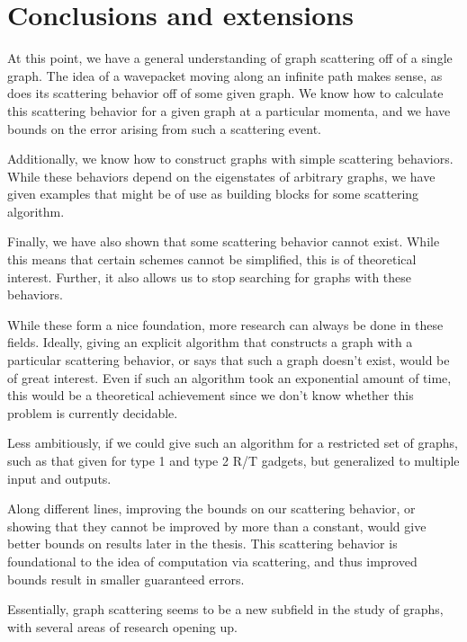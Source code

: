 \documentclass[../thesis-main/thesis-main]{subfiles}
\begin{document}
\section{Conclusions and extensions}



At this point, we have a general understanding of graph scattering off of a single graph.  The idea of a wavepacket moving along an infinite path makes sense, as does its scattering behavior off of some given graph.  We know how to calculate this scattering behavior for a given graph at a particular momenta, and we have bounds on the error arising from such a scattering event.

Additionally, we know how to construct graphs with simple scattering behaviors.  While these behaviors depend on the eigenstates of arbitrary graphs, we have given examples that might be of use as building blocks for some scattering algorithm.

Finally, we have also shown that some scattering behavior cannot exist.  While this means that certain schemes cannot be simplified, this is of theoretical interest.  Further, it also allows us to stop searching for graphs with these behaviors.

While these form a nice foundation, more research can always be done in these fields.  Ideally, giving an explicit algorithm that constructs a graph with a particular scattering behavior, or says that such a graph doesn't exist, would be of great interest.  Even if such an algorithm took an exponential amount of time, this would be a theoretical achievement since we don't know whether this problem is currently decidable.  

Less ambitiously, if we could give such an algorithm for a restricted set of graphs, such as that given for type 1 and type 2 R/T gadgets, but generalized to multiple input and outputs.  

Along different lines, improving the bounds on our scattering behavior, or showing that they cannot be improved by more than a constant, would give better bounds on results later in the thesis.  This scattering behavior is foundational to the idea of computation via scattering, and thus improved bounds result in smaller guaranteed errors.

Essentially, graph scattering seems to be a new subfield in the study of graphs, with several areas of research opening up.

\biblio{}
\end{document}
